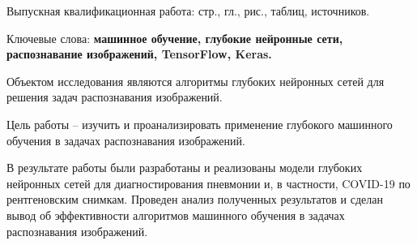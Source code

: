 
Выпускная квалификационная работа: \pageref{LastPage} стр., 
 гл., 
\totalfigures{} рис.,
\totaltables{} таблиц,
 источников.

Ключевые слова: \textbf{машинное обучение, глубокие нейронные сети, распознавание изображений, TensorFlow, Keras.}

Объектом исследования являются алгоритмы глубоких нейронных сетей для решения задач распознавания изображений. 

Цель работы – изучить и проанализировать применение глубокого машинного обучения в задачах распознавания изображений.

В результате работы были разработаны и реализованы модели глубоких нейронных сетей для диагностирования пневмонии и, в частности, COVID-19 по рентгеновским снимкам. Проведен анализ полученных результатов и сделан вывод об эффективности алгоритмов машинного обучения в задачах распознавания изображений.

\clearpage